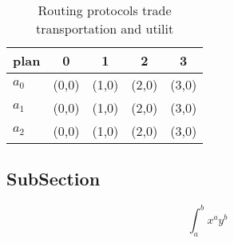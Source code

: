 \documentclass[a4paper]{article}
\begin{document}
\begin{table}
\begin{adjustbox}{width=0.5\columnwidth}
\begin{tabular}{|l|l|l|l|l|}
\hline
\textbf{plan} & \multicolumn{1}{c|}{\textbf{0}} & \multicolumn{1}{c|}{\textbf{1}} & \multicolumn{1}{c|}{\textbf{2}} & \multicolumn{1}{c|}{\textbf{3}} \\ \hline
\textbf{$a_0$}  & (0,0) & (1,0) & (2,0) & (3,0) \\ \hline
\textbf{$a_1$}  & (0,0) & (1,0) & (2,0) & (3,0) \\ \hline
\textbf{$a_2$}  & (0,0) & (1,0) & (2,0) & (3,0) \\ \hline
\end{tabular}
\end{adjustbox}
\caption{Routing protocols trade transportation and utilit
}
\end{table}

\subsection{SubSection}

\[ \int_{a}^{b}{x^{a}y^{b}} \]
\end{document}
